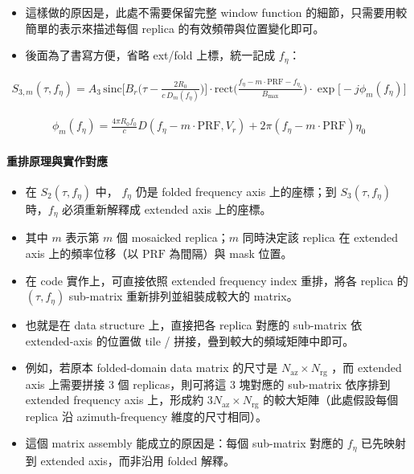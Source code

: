 \documentclass[10pt]{article}
\begin{document}
\begin{itemize}
\item
  這樣做的原因是，此處不需要保留完整 window function
  的細節，只需要用較簡單的表示來描述每個 replica
  的有效頻帶與位置變化即可。
\item
  後面為了書寫方便，省略 ext/fold 上標，統一記成 \(f_\eta\)：
\end{itemize}

\begin{equation}
\begin{aligned}
S_{3,m}(\tau,f_\eta)=A_3\,
\mathrm{sinc}\biggl[B_r\biggl(\tau-\frac{2R_0}{c\,D_m(f_\eta)}\biggr)\biggr]\cdot
\mathrm{rect}\biggl(\frac{f_\eta-m\cdot\mathrm{PRF}-f_{\eta_c}}{B_{\max}}\biggr)\cdot
\exp\biggl[-j\phi_m(f_\eta)\biggr]
\end{aligned}
\end{equation}

\begin{equation}
\begin{aligned}
\phi_m(f_\eta)=\frac{4\pi R_0f_0}{c}D(f_\eta-m\cdot\mathrm{PRF},V_r)+2\pi(f_\eta-m\cdot\mathrm{PRF})\eta_0
\end{aligned}
\end{equation}

\hypertarget{ux91cdux6392ux539fux7406ux8207ux5be6ux4f5cux5c0dux61c9}{%
\paragraph{重排原理與實作對應}\label{ux91cdux6392ux539fux7406ux8207ux5be6ux4f5cux5c0dux61c9}}

\begin{itemize}
\item
  在 \(S_2(\tau,f_\eta)\) 中， \(f_\eta\) 仍是 folded frequency axis
  上的座標；到 \(S_3(\tau,f_\eta)\) 時，\(f_\eta\) 必須重新解釋成
  extended axis 上的座標。
\item
  其中 \(m\) 表示第 \(m\) 個 mosaicked replica；\(m\) 同時決定該 replica
  在 extended axis 上的頻率位移（以 \(\mathrm{PRF}\) 為間隔）與 mask
  位置。
\item
  在 code 實作上，可直接依照 extended frequency index 重排，將各 replica
  的 \((\tau,f_\eta)\) sub-matrix 重新排列並組裝成較大的 matrix。
\item
  也就是在 data structure 上，直接把各 replica 對應的 sub-matrix 依
  extended-axis 的位置做 tile / 拼接，疊到較大的頻域矩陣中即可。
\item
  例如，若原本 folded-domain data matrix 的尺寸是
  \(N_{\mathrm{az}}\times N_{\mathrm{rg}}\) ，而 extended axis
  上需要拼接 3 個 replicas，則可將這 3 塊對應的 sub-matrix 依序排到
  extended frequency axis 上，形成約
  \(3N_{\mathrm{az}}\times N_{\mathrm{rg}}\) 的較大矩陣（此處假設每個
  replica 沿 azimuth-frequency 維度的尺寸相同）。
\item
  這個 matrix assembly 能成立的原因是：每個 sub-matrix 對應的 \(f_\eta\)
  已先映射到 extended axis，而非沿用 folded 解釋。
\end{itemize}
\end{document}
